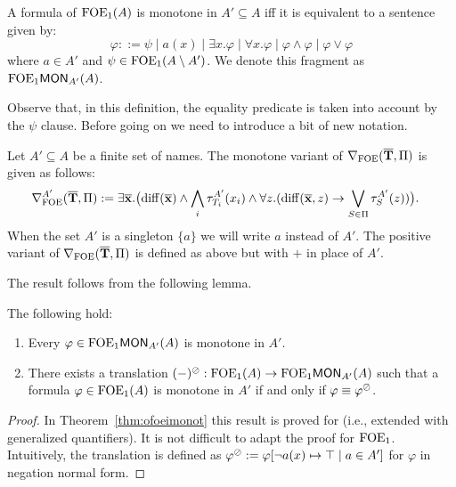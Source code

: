 \begin{theorem}\label{thm:ofoemonot}
A formula of $\ofoe(A)$ is monotone in ${A'\subseteq A}$ iff it is equivalent to a sentence given by:
\[
\varphi ::= \psi \mid a(x) \mid \exists x.\varphi \mid \forall x.\varphi \mid \varphi \land \varphi \mid \varphi \lor \varphi
\]
where $a\in A'$ and $\psi \in \ofoe(A\setminus A')$. We denote this fragment as $\monot{\ofoe}{A'}(A)$.
\end{theorem}

Observe that, in this definition, the equality predicate is taken into account by the $\psi$ clause.
Before going on we need to introduce a bit of new notation. 

\begin{definition}
Let $A'\subseteq A$ be a finite set of names. The monotone variant of $\dbnfofoe{\vlist{T}}{\Pi}$ is given as follows:
\begin{align*}
	\mondbnfofoe{\vlist{T}}{\Pi}{A'} &:= \exists \vlist{x}.\big(\arediff{\vlist{x}} \land \bigwedge_i \tau^{A'}_{T_i}(x_i) \land \forall z.(\arediff{\vlist{x},z} \lthen \bigvee_{S\in \Pi} \tau^{A'}_S(z))\big). 
\end{align*}
When the set $A'$ is a singleton $\{a\}$ we will write $a$ instead of $A'$. The positive variant of $\dbnfofoe{\vlist{T}}{\Pi}$ is defined as above but with $+$ in place of $A'$.
\end{definition}

\noindent The result follows from the following lemma.

\begin{lemma}
The following hold:
\begin{enumerate}
	\itemsep 0pt
	\item Every $\varphi \in \monot{\ofoe}{A'}(A)$ is monotone in $A'$.
	\item There exists a translation $(-)^\tmono:\ofoe(A) \to \monot{\ofoe}{A'}(A)$ such that
a formula ${\varphi \in \ofoe(A)}$ is monotone in $A'$ if and only if $\varphi\equiv \varphi^\tmono$.
\end{enumerate}
\end{lemma}
\begin{proof}
	In Theorem~\ref{thm:ofoeimonot} this result is proved for \ofoei (i.e., \ofoe extended with generalized quantifiers). It is not difficult to adapt the proof for $\ofoe$. Intuitively, the translation is defined as $\varphi^\tmono := \varphi[\lnot a(x) \mapsto \top \mid a\in A']$ for $\varphi$ in negation normal form.
\end{proof}

